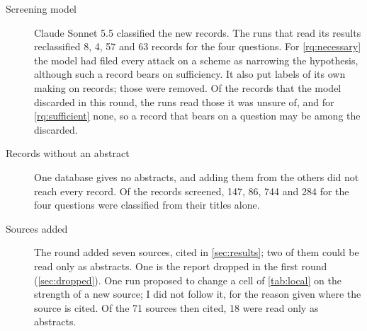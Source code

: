 \begin{description}
  \item[Screening model] Claude Sonnet 5.5 classified the new records.
    The runs that read its results reclassified 8, 4, 57 and 63
    records for the four questions.
    For \cref{rq:necessary} the model had filed every attack on a
    scheme as narrowing the hypothesis, although such a record bears on
    sufficiency.
    It also put labels of its own making on records; those were
    removed.
    Of the records that the model discarded in this round, the runs
    read those it was unsure of, and for \cref{rq:sufficient} none, so
    a record that bears on a question may be among the discarded.
  \item[Records without an abstract] One database gives no abstracts,
    and adding them from the others did not reach every record.
    Of the records screened, 147, 86, 744 and 284 for the four
    questions were classified from their titles alone.
  \item[Sources added] The round added seven sources, cited in
    \cref{sec:results}; two of them could be read only as abstracts.
    One is the report dropped in the first round
    (\cref{sec:dropped}).
    One run proposed to change a cell of \cref{tab:local} on the
    strength of a new source; I did not follow it, for the reason given
    where the source is cited.
    Of the 71 sources then cited, 18 were read only as abstracts.
\end{description}

